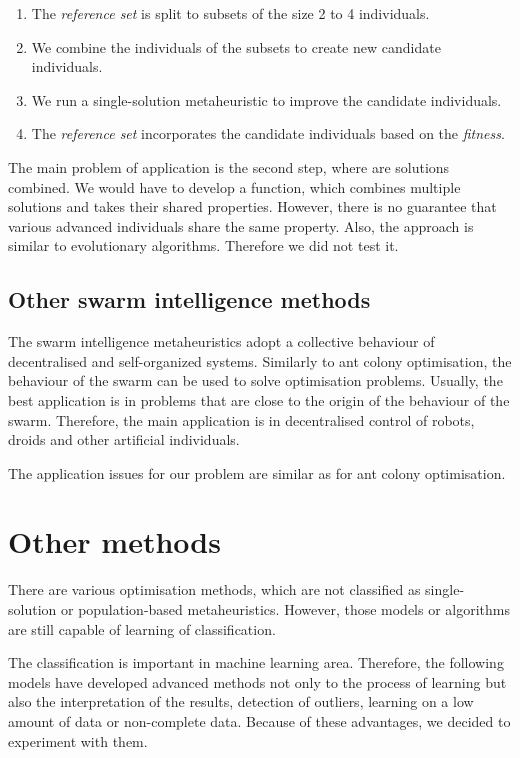 \documentclass[
    digital,    %
    oneside,    %
    color,
    11pt,
    nocover,
    notable,
    nolof,
    nolot,
]{fithesis3}
\begin{document}
\begin{enumerate}
    \item The \textit{reference set} is split to subsets of the size 2 to 4 individuals.
    \item We combine the individuals of the subsets to create new candidate individuals.
    \item We run a single-solution metaheuristic to improve the candidate individuals.
    \item The \textit{reference set} incorporates the candidate individuals based on the \textit{fitness}.
\end{enumerate}

The main problem of application is the second step, where are solutions combined. We would have to develop a function, which combines multiple solutions and takes their shared properties. However, there is no guarantee that various advanced individuals share the same property. Also, the approach is similar to evolutionary algorithms. Therefore we did not test it.

\subsection{Other swarm intelligence methods}
\label{subsec:opt-popul-si}

The swarm intelligence metaheuristics adopt a collective behaviour of decentralised and self-organized systems. Similarly to ant colony optimisation, the behaviour of the swarm can be used to solve optimisation problems. Usually, the best application is in problems that are close to the origin of the behaviour of the swarm. Therefore, the main application is in decentralised control of robots, droids and other artificial individuals.

The application issues for our problem are similar as for ant colony optimisation.


\section{Other methods}
\label{sec:opt-other}

There are various optimisation methods, which are not classified as single-solution or population-based metaheuristics. However, those models or algorithms are still capable of learning of classification.

The classification is important in machine learning area. Therefore, the following models have developed advanced methods not only to the process of learning but also the interpretation of the results, detection of outliers, learning on a low amount of data or non-complete data. Because of these advantages, we decided to experiment with them.
\end{document}
